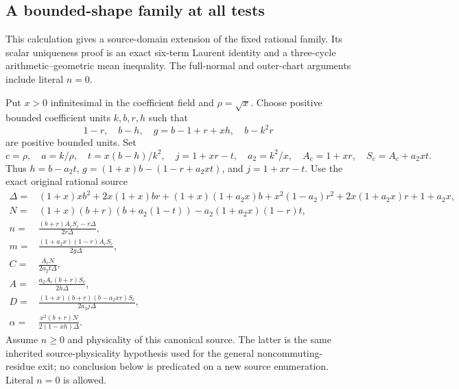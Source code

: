 \subsection{A bounded-shape family at all tests}
\label{component:pec59340d644f}

\label{pec59340d644f:sec:c2-general-single-angle}

This calculation gives a source-domain extension of the fixed rational
family.  Its scalar uniqueness proof is an exact six-term Laurent
identity and a three-cycle arithmetic--geometric mean inequality.
The full-normal and outer-chart arguments include literal $n=0$.

Put $x>0$ infinitesimal in the coefficient field and $\rho=\sqrt{x}$.
Choose positive bounded coefficient units $k,b,r,h$ such that
\[
 1-r,\quad b-h,\quad g=b-1+r+xh,\quad b-k^2r
\]
are positive bounded units.  Set
\[
 c=\rho,\quad a=k/\rho,\quad t=x(b-h)/k^2,
 \quad j=1+xr-t,\quad a_2=k^2/x,
 \quad A_c=1+xr,\quad S_c=A_c+a_2xt.
\]
Thus $h=b-a_2t$, $g=(1+x)b-(1-r+a_2xt)$, and $j=1+xr-t$.
Use the exact original rational source
\begin{align*}
 \Delta={}&(1+x)xb^2+2x(1+x)br+(1+x)(1+a_2x)b
       +x^2(1-a_2)r^2+2x(1+a_2x)r+1+a_2x,\\
 N={}&(1+x)(b+r)(b+a_2(1-t))-a_2(1+a_2x)(1-r)t,\\
 n={}&\frac{(b+r)A_cS_c-r\Delta}{2r\Delta},\\
 m={}&\frac{(1+a_2x)(1-r)A_cS_c}{2g\Delta},\\
 C={}&\frac{A_cN}{2a_2t\Delta},\\
 A={}&\frac{a_2A_c(b+r)S_c}{2h\Delta},\\
 D={}&\frac{(1+x)(b+r)(b-a_2xr)S_c}{2a_2j\Delta},\\
 \alpha={}&\frac{x^2(b+r)N}{2(1-xh)\Delta}.
\end{align*}
Assume $n\geq0$ and physicality of this canonical source.  The latter
is the same inherited source-physicality hypothesis used for the
general noncommuting-residue exit; no conclusion below is predicated
on a new source enumeration.  Literal $n=0$ is allowed.

